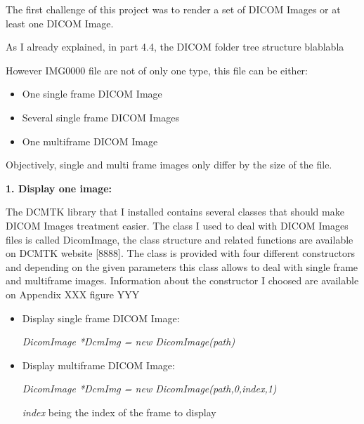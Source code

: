 The first challenge of this project was to render a set of DICOM Images or at least one DICOM Image. 

As I already explained, in part 4.4, the DICOM folder tree structure blablabla 


However IMG0000 file are not of only one type, this file can be either:
\begin{itemize}
	\item One single frame DICOM Image
	\item Several single frame DICOM Images
	\item One multiframe DICOM Image
\end{itemize}

Objectively, single and multi frame images only differ by the size of the file.

\newline \vspace{5mm}	
\textbf{1. Display one image:}

\newline \vspace{5mm}	

The DCMTK library that I installed contains several classes that should make DICOM Images treatment easier.
The class I used to deal with DICOM Images files is called DicomImage, the class structure and related functions are available on DCMTK website [8888].
The class is provided with four different constructors and depending on the given parameters this class allows to deal with single frame and multiframe images. Information about the constructor I choosed are available on Appendix XXX figure YYY


\begin{itemize}
	\item Display single frame DICOM Image:
	
	\begin{center}
	\textit{DicomImage *DcmImg = new DicomImage(path)}
	\end{center}
	
	
	\item Display multiframe DICOM Image:
	
	\begin{center}
	\textit{DicomImage *DcmImg = new DicomImage(path,0,index,1)}
	\end{center}
	
	\textit{index} being the index of the frame to display
	
\end{itemize}

